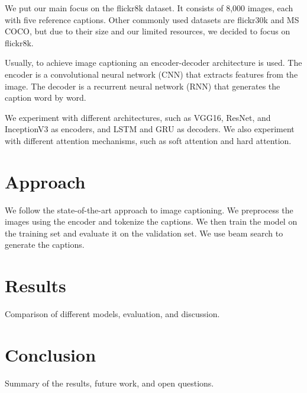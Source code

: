 \documentclass[12pt]{article}
\theoremstyle{plain}
\theoremstyle{definition}
\theoremstyle{remark}
\begin{document}
We put our main focus on the flickr8k dataset. It consists of 8,000 images, each with five reference captions. Other commonly used datasets are flickr30k and MS COCO, but due to their size and our limited resources, we decided to focus on flickr8k.

Usually, to achieve image captioning an encoder-decoder architecture is used. The encoder is a convolutional neural network (CNN) that extracts features from the image. The decoder is a recurrent neural network (RNN) that generates the caption word by word.

We experiment with different architectures, such as VGG16, ResNet, and InceptionV3 as encoders, and LSTM and GRU as decoders. We also experiment with different attention mechanisms, such as soft attention and hard attention.

\section{Approach}
\label{sec:approach}

We follow the state-of-the-art approach to image captioning. We preprocess the images using the encoder and tokenize the captions. We then train the model on the training set and evaluate it on the validation set. We use beam search to generate the captions.

\section{Results}
\label{sec:results}

Comparison of different models, evaluation, and discussion.

\section{Conclusion}
\label{sec:concl}

Summary of the results, future work, and open questions.



\newpage
\thispagestyle{empty}

\nocite{*}


\end{document}
